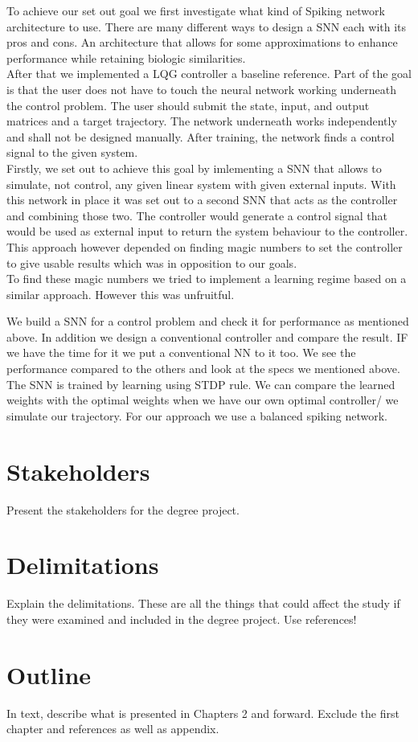 To achieve our set out goal we first investigate what kind of Spiking network architecture to use. There are many different ways to design a \ac{SNN} each with its pros and cons. An architecture that allows for some approximations to enhance performance while retaining biologic similarities.\\
After that we implemented a LQG controller a baseline reference.
Part of the goal is that the user does not have to touch the neural network working underneath the control problem. The user should submit the state, input, and output matrices and a target trajectory.
The network underneath works independently and shall not be designed manually. After training, the network finds a control signal to the given system.\\
Firstly, we set out to achieve this goal by imlementing a \ac{SNN} that allows to simulate, not control, any given linear system with given external inputs. With this network in place it was set out to a second \ac{SNN} that acts as the controller and combining those two. The controller would generate a control signal that would be used as external input to return the system behaviour to the controller. This approach however depended on finding magic numbers to set the controller to give usable results which was in opposition to our goals.\\
To find these magic numbers we tried to implement a learning regime based on a similar approach. However this was unfruitful.

We build a SNN for a control problem and check it for performance as mentioned above. In addition we design a conventional controller and compare the result. IF we have the time for it we put a conventional NN to it too. We see the performance compared to the others and look at the specs we mentioned above.
The SNN is trained by learning using STDP rule. We can compare the learned weights with the optimal weights when we have our own optimal controller/ we simulate our trajectory.
For our approach we use a balanced spiking network.
\section{Stakeholders}
Present the stakeholders for the degree project.

\section{Delimitations}
Explain the delimitations. These are all the things that could affect the study if they were examined and included in the degree project.
Use references!

\section{Outline}
In text, describe what is presented in Chapters 2 and forward. Exclude the first chapter and references as well as appendix.
